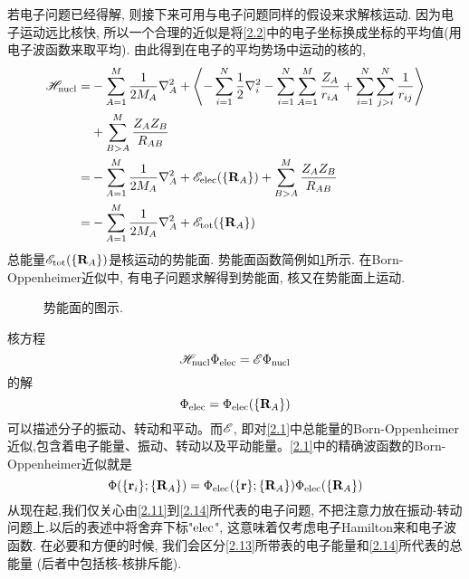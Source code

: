 若电子问题已经得解, 则接下来可用与电子问题同样的假设来求解核运动. 因为电子运动远比核快, 所以一个合理的近似是将\ref{2.2}中的电子坐标换成坐标的平均值(用电子波函数来取平均). 由此得到在电子的平均势场中运动的核的\ha,
\begin{equation}
\begin{split}
\mathscr{H}_{\rm nucl}= &- \sum_{A=1}^{M}\frac{1}{2M_A}\nabla_A^2 + \Braket{-\sum_{i=1}^{N}\frac{1}{2}\nabla_i^2 - \sum_{i=1}^{N}\sum_{A=1}^{M}\frac{Z_A}{r_{iA}} + \sum_{i=1}^{N}\sum_{j>i}^{N}\frac{1}{r_{ij}}}\\
& + \sum_{B>A}^M\frac{Z_AZ_B}{R_{AB}}\\
= & - \sum_{A=1}^{M}\frac{1}{2M_A}\nabla_A^2 + \mathscr{E}_{\rm elec}(\{\mathbf{R}_A\}) + \sum_{B>A}^M\frac{Z_AZ_B}{R_{AB}}\\
= & - \sum_{A=1}^{M}\frac{1}{2M_A}\nabla_A^2 + \mathscr{E}_{\rm tot}(\{\mathbf{R}_A\})
\end{split}
\end{equation}
总能量$ \mathscr{E}_{\rm tot}(\{\mathbf{R}_A\}) $是核运动的势能面. 势能面函数简例如\ref{f2.2}所示. 在Born-Oppenheimer近似中, 有电子问题求解得到势能面, 核又在势能面上运动. 
\begin{figure}[H]
	\def\FunctionA(#1){180*((0.6/(#1+.5))^(12) -(0.6/(#1+ .5))^(6)) + 60}
	\def\FunctionF(#1){(#1)^3- 3*(#1)}
	\caption{势能面的图示.}
	\label{f2.2}
\end{figure}
核\sch 方程
\begin{equation}
\mathscr{H}_{\rm nucl}\Phi_{\rm elec} = \mathscr{E}\Phi_{\rm nucl}
\end{equation}的解
\begin{equation}
\Phi_{\rm elec}=\Phi_{\rm elec}(\{\mathbf{R}_A\})
\end{equation}
可以描述分子的振动、转动和平动。而$\mathscr{E}$, 即对\ref{2.1}中总能量的Born-Oppenheimer近似,包含着电子能量、振动、转动以及平动能量。\ref{2.1}中的精确波函数的Born-Oppenheimer近似就是
\begin{equation}
\Phi(\{\mathbf{r}_i\};\{\mathbf{R}_A\}) = \Phi_{\rm elec}(\{\mathbf{r}\};\{\mathbf{R}_A\})\Phi_{\rm elec}(\{\mathbf{R}_A\})
\end{equation}
从现在起,我们仅关心由\ref{2.11}到\ref{2.14}所代表的电子问题, 不把注意力放在振动-转动问题上.以后的表述中将舍弃下标"$\rm elec$",  这意味着仅考虑电子Hamilton来和电子波函数. 在必要和方便的时候, 我们会区分\ref{2.13}所带表的电子能量和\ref{2.14}所代表的总能量 (后者中包括核-核排斥能).

